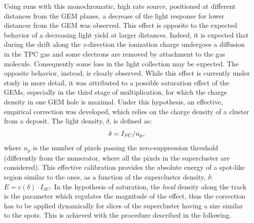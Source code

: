 Using runs with this monochromatic, high rate source, positioned at
different distances from the GEM planes, a decrease of the light
response for lower distances from the GEM was observed. This effect is
opposite to the expected behavior of a decreasing light yield at
larger distances. Indeed, it is expected that during the drift along
the $z$-direction the ionization charge undergoes a diffusion in the
TPC gas and some electrons are removed by attachment to the gas
molecule.  Consequently some loss in the light collection may be
expected. The opposite behavior, instead, is clearly observed. While
this effect is currently under study in more detail, it was attributed
to a possible saturation effect of the GEMs, especially in the third
stage of multiplication, for which the charge density in one GEM hole
is maximal.  Under this hypothesis, an effective, empirical correction
was developed, which relies on the charge density of a cluster from
a \fe deposit. The light density, $\delta$, is defined as:
\begin{equation}
  \label{eq:density}
  \delta = I_{SC} / n_p,
\end{equation}
where $n_p$ is the number of pixels passing the zero-suppression
threshold (differently from the numerator, where all the pixels in the
supercluster are considered). This effective calibration provides the
absolute energy of a spot-like region similar to the \fe ones, as a
function of the supercluster density, $\delta$: $E=c(\delta)\cdot
I_{SC}$. In the hypothesis of saturation, the
\textit{local} density along the track is the parameter which
regulates the magnitude of the effect, thus the correction has to be
applied dynamically for slices of the supercluster having a size
similar to the \fe spots.  This is achieved with the procedure
described in the following.

